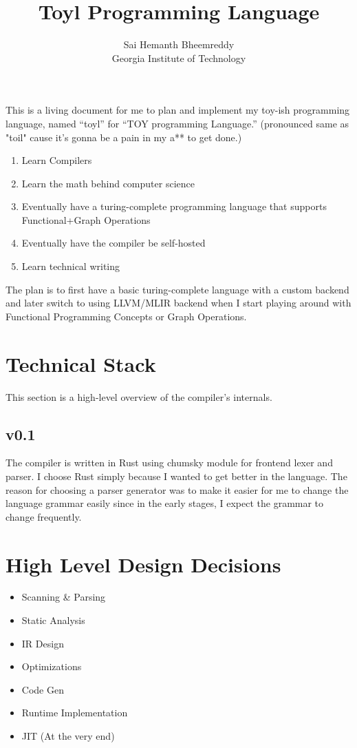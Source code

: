 \documentclass[11pt]{article}
\title{Toyl Programming Language}
\author{Sai Hemanth Bheemreddy\\Georgia Institute of Technology}
\date{}
\begin{document}
\maketitle

This is a living document for me to plan and implement my toy-ish programming language, named ``toyl'' for ``TOY programming Language.'' (pronounced same as "toil" cause it's gonna be a pain in my a** to get done.)
\begin{enumerate}
  \item Learn Compilers
  \item Learn the math behind computer science
  \item Eventually have a turing-complete programming language that supports Functional+Graph Operations
  \item Eventually have the compiler be self-hosted
  \item Learn technical writing
\end{enumerate}

The plan is to first have a basic turing-complete language with a custom backend and later switch to using LLVM/MLIR backend when I start playing around with Functional Programming Concepts or Graph Operations.

\section{Technical Stack}
This section is a high-level overview of the compiler's internals.

\subsection{v0.1}
The compiler is written in Rust using chumsky module for frontend lexer and parser. I choose Rust simply because I wanted to get better in the language. The reason for choosing a parser generator was to make it easier for me to change the language grammar easily since in the early stages, I expect the grammar to change frequently.


\section{High Level Design Decisions}


\begin{itemize}
  \item Scanning \& Parsing
  \item Static Analysis
  \item IR Design
  \item Optimizations
  \item Code Gen
  \item Runtime Implementation
  \item JIT (At the very end)
\end{itemize}
\end{document}

